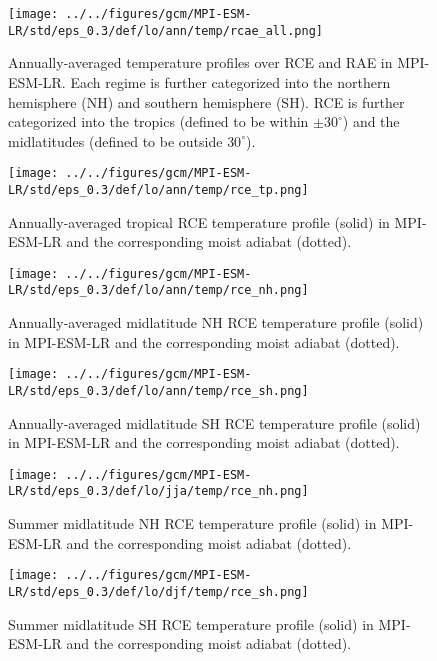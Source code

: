 \documentclass[11pt]{article}
\begin{document}
\begin{figure}[htbp]
\centering
\texttt{[image: ../../figures/gcm/MPI-ESM-LR/std/eps\_0.3/def/lo/ann/temp/rcae\_all.png]}
\caption{\label{fig:org92b6827}Annually-averaged temperature profiles over RCE and RAE in MPI-ESM-LR. Each regime is further categorized into the northern hemisphere (NH) and southern hemisphere (SH). RCE is further categorized into the tropics (defined to be within \(\pm 30^\circ\)) and the midlatitudes (defined to be outside \(30^\circ\)).}
\end{figure}

\begin{figure}[htbp]
\centering
\texttt{[image: ../../figures/gcm/MPI-ESM-LR/std/eps\_0.3/def/lo/ann/temp/rce\_tp.png]}
\caption{\label{fig:org1181672}Annually-averaged tropical RCE temperature profile (solid) in MPI-ESM-LR and the corresponding moist adiabat (dotted).}
\end{figure}

\begin{figure}[htbp]
\centering
\texttt{[image: ../../figures/gcm/MPI-ESM-LR/std/eps\_0.3/def/lo/ann/temp/rce\_nh.png]}
\caption{\label{fig:orga98f121}Annually-averaged midlatitude NH RCE temperature profile (solid) in MPI-ESM-LR and the corresponding moist adiabat (dotted).}
\end{figure}

\begin{figure}[htbp]
\centering
\texttt{[image: ../../figures/gcm/MPI-ESM-LR/std/eps\_0.3/def/lo/ann/temp/rce\_sh.png]}
\caption{\label{fig:org5641dfd}Annually-averaged midlatitude SH RCE temperature profile (solid) in MPI-ESM-LR and the corresponding moist adiabat (dotted).}
\end{figure}

\begin{figure}[htbp]
\centering
\texttt{[image: ../../figures/gcm/MPI-ESM-LR/std/eps\_0.3/def/lo/jja/temp/rce\_nh.png]}
\caption{\label{fig:orgd6d7b3e}Summer midlatitude NH RCE temperature profile (solid) in MPI-ESM-LR and the corresponding moist adiabat (dotted).}
\end{figure}

\begin{figure}[htbp]
\centering
\texttt{[image: ../../figures/gcm/MPI-ESM-LR/std/eps\_0.3/def/lo/djf/temp/rce\_sh.png]}
\caption{\label{fig:orgfd57e48}Summer midlatitude SH RCE temperature profile (solid) in MPI-ESM-LR and the corresponding moist adiabat (dotted).}
\end{figure}
\end{document}
